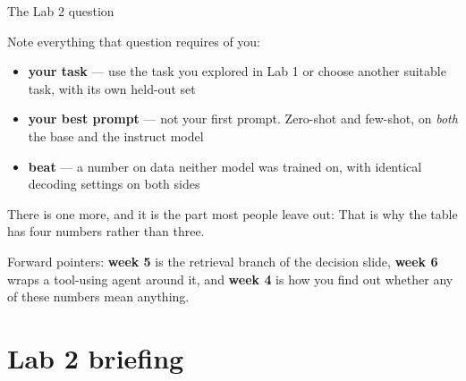 \documentclass[aspectratio=169,10pt]{beamer}
\begin{document}
\begin{frame}{The Lab 2 question}
  \centering
  \vspace{0.6em}
  {\Large{}}
  \vspace{1.0em}

  \raggedright
  Note everything that question requires of you:
  \begin{itemize}
    \item \textbf{your task} --- use the task you explored in Lab 1 or choose
      another suitable task, with its own held-out set
    \item \textbf{your best prompt} --- not your first prompt. Zero-shot and
      few-shot, on \emph{both} the base and the instruct model
    \item \textbf{beat} --- a number on data neither model was trained on,
      with identical decoding settings on both sides
  \end{itemize}
  \vspace{0.6em}
  There is one more, and it is the part most people leave out:  That is why the table has four numbers rather than three.
  \vspace{0.5em}

  \small
  Forward pointers: \textbf{week 5} is the retrieval branch of the decision
  slide, \textbf{week 6} wraps a tool-using agent around it, and \textbf{week
  4} is how you find out whether any of these numbers mean anything.
\end{frame}

\section{Lab 2 briefing}
\end{document}
